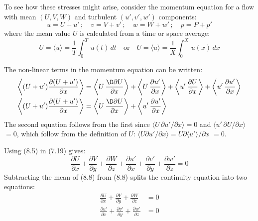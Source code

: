 To see how these stresses might arise, consider the momentum equation
for a flow with mean $(U, V, W)$ and turbulent $(u', v', w')$
components:
\begin{equation}
u=U+u' \,;\quad v = V+v' \,;\quad w=W+w' \, ;\quad p=P+p'
\end{equation}
where the mean value $U$ is calculated from a time or space average:
\begin{equation}
U = \langle u \rangle =\frac{1}{T}\int^T_0\,u(t)\,dt \quad \text{or}\quad
U = \langle u \rangle =\frac{1}{X}\int^X_0\,u(x)\,dx
\end{equation}

The non-linear terms in the momentum equation can be written:
\begin{align}
\left< (U+u')\frac{\partial{(U+u')}}{\partial{x}} \right> &= \left<
U\,\frac{\D \partial{U}}{\partial{x}}\right> +
\left< U\,\frac {\partial{u'}}{\partial{x}}\right> +
\left< u' \,\frac {\partial{U}}{\partial{x}}\right> + \left< u' \,\frac
{\partial{u'}}{\partial{x}}\right> \notag \\
\left< (U+u')\frac{\partial{(U+u')}}{\partial{x}} \right> &= \left<
U\,\frac{\D \partial{U}}{\partial{x}}\right> +
\left<u' \,\frac{\partial{u'}}{\partial{x}}\right>
\end{align}
The second equation follows from the first since $\langle
U\,\partial{u'}/\partial{x}\rangle = 0$ and $\langle
u'\,\partial{U}/\partial{x}\rangle$ $= 0$, which follow from the
definition of $U$: $\langle U \partial{u'}/\partial{x}\rangle = U
\partial{\langle u' \rangle }/\partial{x}$ $ = 0$.

Using (8.5) in (7.19) gives:
\begin{equation}
\frac{\partial{U }}{\partial{x}} + \frac{\partial{V }}{\partial{y}}  +\frac{\partial{W }}{\partial{z}} + 
\frac{\partial{u'}}{\partial{x}} + \frac{\partial{v'}}{\partial{y}}
+\frac{\partial{w'}}{\partial{z}} =0
\end{equation}
Subtracting the mean of (8.8) from (8.8) splits the continuity
equation into two equations:
\begin{subequations}
\begin{align}
\frac{\partial{U }}{\partial{x}} + \frac{\partial{V }}{\partial{y}}  +\frac{\partial{W }}{\partial{z}} &= 0 \\
\frac{\partial{u'}}{\partial{x}} + \frac{\partial{v'}}{\partial{y}} +\frac{\partial{w'}}{\partial{z}} &=0
\end{align}
\end{subequations}


